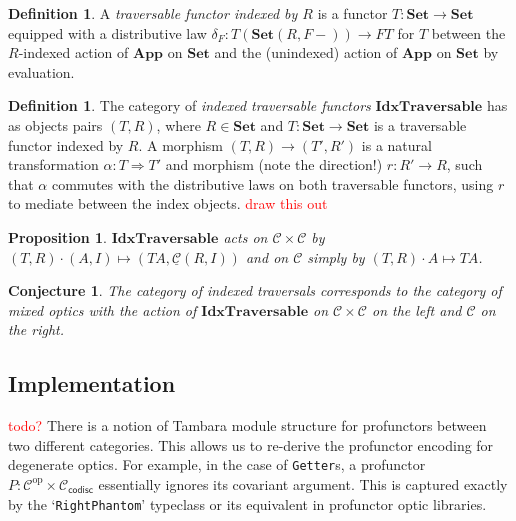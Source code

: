\documentclass[11pt,letterpaper]{article}
\theoremstyle{plain}
\newtheorem{proposition}[theorem]{Proposition}
\newtheorem{conjecture}[theorem]{Conjecture}
\theoremstyle{definition}
\newtheorem{definition}[theorem]{Definition}
\newcommand{\C}{\mathscr{C}}
\newcommand{\homC}{\underline{\C}}
\newcommand{\Set}{\mathbf{Set}}
\newcommand{\App}{\mathbf{App}}
\newcommand{\IdxTraversable}{\mathbf{IdxTraversable}}
\newcommand{\op}{\mathrm{op}}
\newcommand{\act}{\cdot}
\newcommand{\todo}[1]{\textcolor{red}{\small #1}}
\begin{document}
\begin{definition}
A \emph{traversable functor indexed by $R$} is a functor $T : \Set \to \Set$ equipped with a distributive law $\delta_F : T(\Set(R, F-)) \to FT$ for $T$ between the $R$-indexed action of $\App$ on $\Set$ and the (unindexed) action of $\App$ on $\Set$ by evaluation.
\end{definition}

\begin{definition}
The category of \emph{indexed traversable functors} $\IdxTraversable$ has as objects pairs $(T, R)$, where $R \in \Set$ and $T : \Set \to \Set$ is a traversable functor indexed by $R$. A morphism $(T, R) \to (T', R')$ is a natural transformation $\alpha : T \Rightarrow T'$ and morphism (note the direction!) $r : R' \to R$, such that $\alpha$ commutes with the distributive laws on both traversable functors, using $r$ to mediate between the index objects. \todo{draw this out}
\end{definition}

\begin{proposition}
$\IdxTraversable$ acts on $\C \times \C$ by $(T, R) \act (A, I) \mapsto (TA, \homC(R, I))$ and on $\C$ simply by $(T, R) \act A \mapsto TA$.
\end{proposition}

\begin{conjecture}
The category of indexed traversals corresponds to the category of mixed optics with the action of $\IdxTraversable$ on $\C \times \C$ on the left and $\C$ on the right.
\end{conjecture}


\subsection{Implementation}
\todo{todo?}
There is a notion of Tambara module structure for profunctors between two different categories. This allows us to re-derive the profunctor encoding for degenerate optics. For example, in the case of \texttt{Getter}s, a profunctor $P : \C^\op \times \C_\mathsf{codisc}$ essentially ignores its covariant argument. This is captured exactly by the `\texttt{RightPhantom}' typeclass or its equivalent in profunctor optic libraries.



\end{document}
